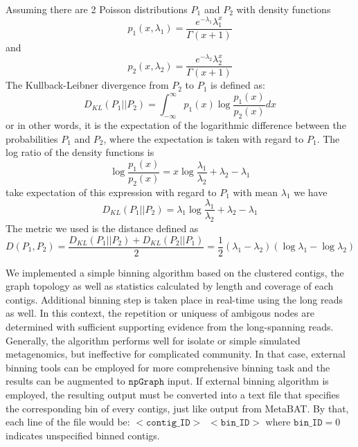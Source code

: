 \documentclass[10pt,twocolumn,twoside]{genpaper}
\newcommand{\npgraph}{$\mathtt{npGraph}$}
\begin{document}
Assuming there are 2 Poisson distributions $P_1$ and $P_2$ with density functions $$p_1(x,\lambda_1)=\frac{e^{-\lambda_1}\lambda_1^x}{\Gamma(x+1)}$$ and $$p_2(x,\lambda_2)=\frac{e^{-\lambda_2}\lambda_2^x}{\Gamma(x+1)}$$ 
The Kullback-Leibner divergence from $P_2$ to $P_1$ is defined as:
$$D_{KL}(P_1||P_2)=\int_{-\infty}^{\infty} p_1(x)\log{\frac{p_1(x)}{p_2(x)}} dx$$
or in other words,  it is the expectation of the logarithmic difference between the probabilities $P_1$ and $P_2$, where the expectation is taken with regard to $P_1$.
The log ratio of the density functions is
$$\log{\frac{p_1(x)}{p_2(x)}}=x\log{\frac{\lambda_1}{\lambda_2}}+\lambda_2-\lambda_1$$
take expectation of this expression with regard to $P_1$ with mean $\lambda_1$ we have
$$D_{KL}(P_1||P_2)=\lambda_1\log{\frac{\lambda_1}{\lambda_2}}+\lambda_2-\lambda_1$$
The metric we used is the distance defined as
$$D(P_1,P_2)=\frac{D_{KL}(P_1||P_2)+D_{KL}(P_2||P_1)}{2}=\frac{1}{2}(\lambda_1-\lambda_2)(\log{\lambda_1}-\log{\lambda_2})$$

We implemented a simple binning algorithm based on the clustered contigs, the graph topology as well as statistics calculated by length and coverage of each contigs. 
Additional binning step is taken place in real-time using the long reads as well. In this context, the repetition or uniquess of ambigous nodes are determined with sufficient supporting evidence from the long-spanning reads.
Generally, the algorithm performs well for isolate or simple simulated metagenomics, but ineffective for complicated community. In that case, external binning tools can be employed for more comprehensive binning task and the results can be augmented to \npgraph{} input.
If external binning algorithm is employed, the resulting output must be converted into a text file that specifies the corresponding bin of every contigs, just like output from MetaBAT. By that, each line of the file would be:
$
\mathtt{<contig\_ID>} \; ~ \mathtt{<bin\_ID>}
$
where $\mathtt{bin\_ID}=0$ indicates unspecified binned contigs.
\end{document}
